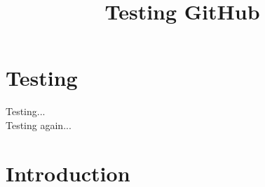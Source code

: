 \documentclass{article}
\title{Testing GitHub}
\author{}
\date{}
\begin{document}
\maketitle

\section{Testing}
Testing...\\
Testing again...
\section{Introduction}
\lipsum[1-5]
\end{document}

